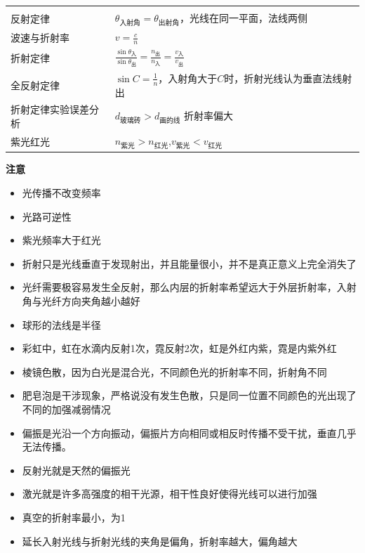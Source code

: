 \documentclass{cheatsheet}
\begin{document}
\begin{tabularx}{\columnwidth}{XX}
	\rowcolor{blue!30}
	\multicolumn{2}{l}{\parbox[c][2.5\ht\strutbox][c]{0.9\columnwidth}{\Large 几何光学}} \\
	反射定律  & $\theta_{\text{入射角}}=\theta_{\text{出射角}}$，光线在同一平面，法线两侧\\
	波速与折射率 & $v=\frac cn$\\
	折射定律  & $\frac{\sin\theta_{\text{入}}}{\sin\theta_{\text{出}}}=\frac{n_{\text{出}}}{n_{\text{入}}}=\frac{v_{\text{入}}}{v_{\text{出}}}$\\
	全反射定律 & $\sin C=\frac1n$，入射角大于$C$时，折射光线认为垂直法线射出\\
	折射定律实验误差分析 & $d_{\text{玻璃砖}}>d_{\text{画的线}}$ 折射率偏大\\
	紫光红光 & $n_{\text{紫光}}>n_{\text{红光}}$,$v_{\text{紫光}}<v_{\text{红光}}$\\
\end{tabularx}
\textbf{注意}
\begin{itemize}
	\item 光传播不改变频率
	\item 光路可逆性
	\item 紫光频率大于红光
	\item 折射只是光线垂直于发现射出，并且能量很小，并不是真正意义上完全消失了
	\item 光纤需要极容易发生全反射，那么内层的折射率希望远大于外层折射率，入射角与光纤方向夹角越小越好
	\item 球形的法线是半径
	\item 彩虹中，虹在水滴内反射1次，霓反射2次，虹是外红内紫，霓是内紫外红
	\item 棱镜色散，因为白光是混合光，不同颜色光的折射率不同，折射角不同
	\item 肥皂泡是干涉现象，严格说没有发生色散，只是同一位置不同颜色的光出现了不同的加强减弱情况
	\item 偏振是光沿一个方向振动，偏振片方向相同或相反时传播不受干扰，垂直几乎无法传播。
	\item 反射光就是天然的偏振光
	\item 激光就是许多高强度的相干光源，相干性良好使得光线可以进行加强
	\item 真空的折射率最小，为1
	\item 延长入射光线与折射光线的夹角是偏角，折射率越大，偏角越大
\end{itemize}
\end{document}
